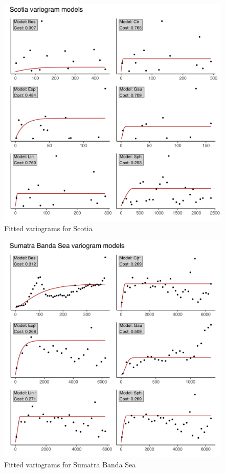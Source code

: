 \begin{figure}
\centering
\includegraphics{assets/figs/chpt3/ScotiaVgrms.png}
\caption[Fitted variograms for Scotia]{Fitted variograms for Scotia}
\end{figure}

\begin{figure}
\centering
\includegraphics{assets/figs/chpt3/SumatraBandaSeaVgrms.png}
\caption[Fitted variograms for Sumatra Banda Sea]{Fitted variograms for Sumatra Banda Sea}
\end{figure}

